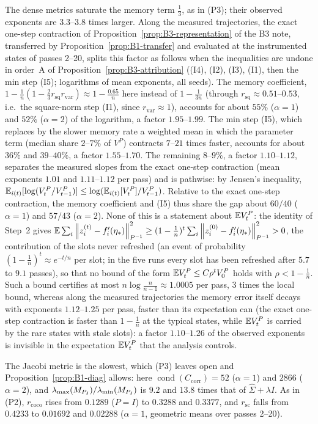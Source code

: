 The dense metrics saturate the memory term $\frac13$, as in (P3); their observed exponents are $3.3$--$3.8$
times larger. Along the measured trajectories, the exact one-step contraction of
Proposition~\ref{prop:B3-representation} of the B3 note, transferred by Proposition~\ref{prop:B1-transfer} and
evaluated at the instrumented states of passes 2--20, splits this factor as follows when the inequalities are
undone in order~A of Proposition~\ref{prop:B3-attribution} ((I4), (I2), (I3), (I1), then the min step (I5);
logarithms of mean exponents, all seeds). The memory coefficient, $1-\frac1n(1-\frac23r_{\mathrm{sq}}r_{\mathrm{var}})\approx1-\frac{0.65}n$
here instead of $1-\frac1{3n}$ (through $r_{\mathrm{sq}}\approx0.51$--$0.53$, i.e.\ the square-norm step (I1), since
$r_{\mathrm{var}}\approx1$), accounts for about $55\%$ ($\alpha=1$) and $52\%$ ($\alpha=2$) of the logarithm, a
factor $1.95$--$1.99$. The min step (I5), which replaces by the slower memory rate a weighted mean in which the
parameter term (median share $2$--$7\%$ of $V^P$) contracts $7$--$21$ times faster, accounts for about $36\%$
and $39$--$40\%$, a factor $1.55$--$1.70$. The remaining $8$--$9\%$, a factor $1.10$--$1.12$, separates the
measured slopes from the exact one-step contraction (mean exponents $1.01$ and $1.11$--$1.12$ per pass) and is
pathwise: by Jensen's inequality, $\mathbb{E}_{i(t)}[\log(V_t^P/V_{t-1}^P)]\le\log(\mathbb{E}_{i(t)}[V_t^P]/V_{t-1}^P)$. Relative to the exact
one-step contraction, the memory coefficient and (I5) thus share the gap about $60/40$ ($\alpha=1$) and $57/43$
($\alpha=2$). None of this is a statement about $\mathbb{E} V_t^P$: the identity of Step~2 gives
$\mathbb{E}\sum_i\left\|z_i^{(t)}-f'_i(\eta_\ast)\right\|_{P^{-1}}^2\ge(1-\frac1n)^t\sum_i\left\|z_i^{(0)}-f'_i(\eta_\ast)\right\|_{P^{-1}}^2>0$,
the contribution of the slots never refreshed (an event of probability $(1-\frac1n)^t\approx e^{-t/n}$ per slot;
in the five runs every slot has been refreshed after $5.7$ to $9.1$ passes), so that no bound of the form
$\mathbb{E} V_t^P\le C\rho^tV_0^P$ holds with $\rho<1-\frac1n$. Such a bound certifies at most
$n\log\frac n{n-1}\approx1.0005$ per pass, $3$ times the local bound, whereas along the measured trajectories the
memory error itself decays with exponents $1.12$--$1.25$ per pass, faster than its expectation can (the exact
one-step contraction is faster than $1-\frac1n$ at the typical states, while $\mathbb{E} V_t^P$ is carried by the rare
states with stale slots): a factor $1.10$--$1.26$ of the observed exponents is invisible in the expectation
$\mathbb{E} V_t^P$ that the analysis controls.

The Jacobi metric is the slowest, which (P3) leaves open and Proposition~\ref{prop:B1-diag} allows: here
$\operatorname{cond}(C_{\mathrm{corr}})=52$ ($\alpha=1$) and $2866$ ($\alpha=2$), and
$\lambda_{\max}(M_{P_{\mathrm J}})/\lambda_{\min}(M_{P_{\mathrm J}})$ is $9.2$ and $13.8$ times that of $\hat\Sigma+\lambda I$. As in
(P2), $r_{\mathrm{coco}}$ rises from $0.1289$ ($P=I$) to $0.3288$ and $0.3377$, and $r_{\mathrm{sc}}$ falls from
$0.4233$ to $0.01692$ and $0.02288$ ($\alpha=1$, geometric means over passes 2--20).

